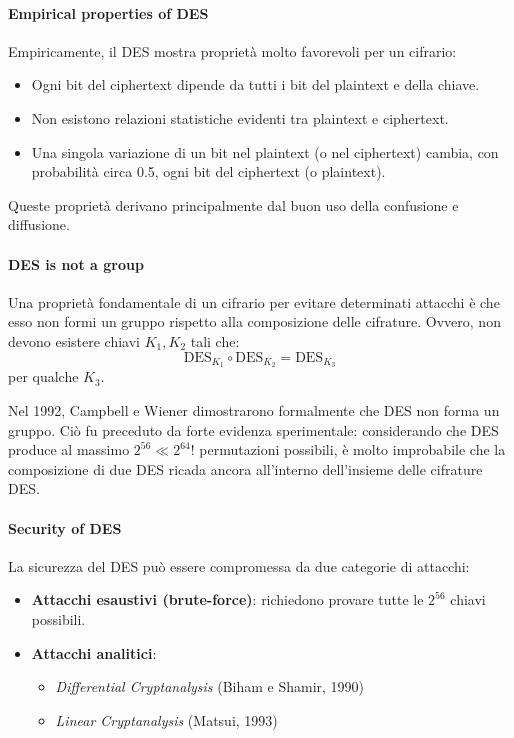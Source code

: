 \documentclass{report}
\begin{document}
\paragraph{Empirical properties of DES}

Empiricamente, il DES mostra proprietà molto favorevoli per un cifrario:

\begin{itemize}
    \item Ogni bit del ciphertext dipende da tutti i bit del plaintext e della chiave.
    \item Non esistono relazioni statistiche evidenti tra plaintext e ciphertext.
    \item Una singola variazione di un bit nel plaintext (o nel ciphertext) cambia, con probabilità circa 0.5, ogni bit del ciphertext (o plaintext).
\end{itemize}

Queste proprietà derivano principalmente dal buon uso della confusione e diffusione.

\paragraph{DES is not a group}

Una proprietà fondamentale di un cifrario per evitare determinati attacchi è che esso non formi un gruppo rispetto alla composizione delle cifrature. Ovvero, non devono esistere chiavi $K_1, K_2$ tali che:
\[
\text{DES}_{K_1} \circ \text{DES}_{K_2} = \text{DES}_{K_3}
\]
per qualche $K_3$.

Nel 1992, Campbell e Wiener dimostrarono formalmente che DES non forma un gruppo. Ciò fu preceduto da forte evidenza sperimentale: considerando che DES produce al massimo $2^{56} \ll 2^{64}!$ permutazioni possibili, è molto improbabile che la composizione di due DES ricada ancora all’interno dell’insieme delle cifrature DES.

\paragraph{Security of DES}

La sicurezza del DES può essere compromessa da due categorie di attacchi:

\begin{itemize}
    \item \textbf{Attacchi esaustivi (brute-force)}: richiedono provare tutte le $2^{56}$ chiavi possibili.
    \item \textbf{Attacchi analitici}:
    \begin{itemize}
        \item \textit{Differential Cryptanalysis} (Biham e Shamir, 1990)
        \item \textit{Linear Cryptanalysis} (Matsui, 1993)
    \end{itemize}
\end{itemize}
\end{document}
